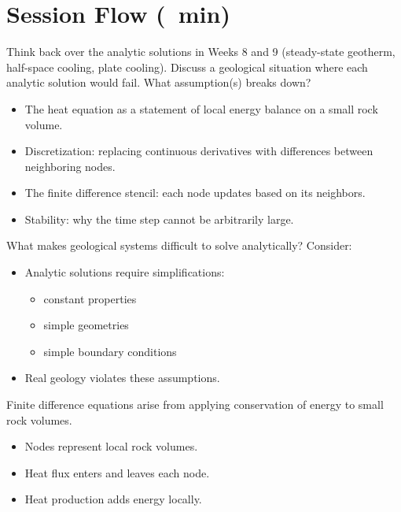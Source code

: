 \section*{Session Flow (\timelinelength\ min)}


Think back over the analytic solutions in Weeks 8 and 9 (steady-state geotherm, half-space cooling, plate cooling). Discuss a geological situation where each analytic solution would fail. What assumption(s) breaks down?


\begin{itemize}
    \item The heat equation as a statement of local energy balance on a small rock volume.
    \item Discretization: replacing continuous derivatives with differences between neighboring nodes.
    \item The finite difference stencil: each node updates based on its neighbors.
    \item Stability: why the time step cannot be arbitrarily large.
\end{itemize}

What makes geological systems difficult to solve analytically? Consider:
\begin{itemize}
    \item Analytic solutions require simplifications:
    \begin{itemize}
        \item constant properties
        \item simple geometries
        \item simple boundary conditions
    \end{itemize}
    \item Real geology violates these assumptions.
\end{itemize}


Finite difference equations arise from applying conservation of energy to small
rock volumes.

\begin{itemize}
    \item Nodes represent local rock volumes.
    \item Heat flux enters and leaves each node.
    \item Heat production adds energy locally.
\end{itemize}

